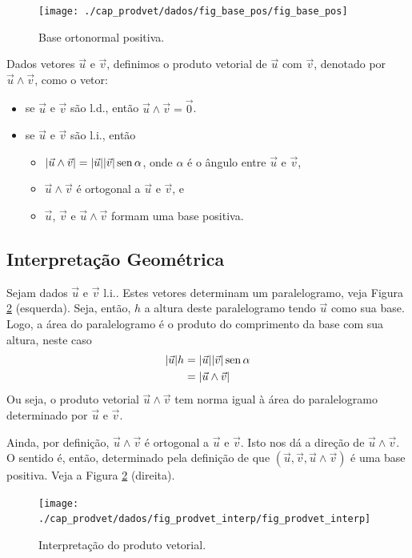 \begin{figure}[H]
  \centering
  \texttt{[image: ./cap\_prodvet/dados/fig\_base\_pos/fig\_base\_pos]}
  \caption{Base ortonormal positiva.}
  \label{fig:base_pos}
\end{figure}

Dados vetores $\vec{u}$ e $\vec{v}$, definimos o produto vetorial de $\vec{u}$ com $\vec{v}$, denotado por $\vec{u}\land\vec{v}$, como o vetor:
\begin{itemize}
\item se $\vec{u}$ e $\vec{v}$ são l.d., então $\vec{u}\land\vec{v} = \vec{0}$.
\item se $\vec{u}$ e $\vec{v}$ são l.i., então
  \begin{itemize}
  \item $|\vec{u}\land\vec{v}| = |\vec{u}||\vec{v}|\operatorname{sen}\alpha$, onde $\alpha$ é o ângulo entre $\vec{u}$ e $\vec{v}$,
  \item $\vec{u}\land\vec{v}$ é ortogonal a $\vec{u}$ e $\vec{v}$, e
  \item $\vec{u}$, $\vec{v}$ e $\vec{u}\land\vec{v}$ formam uma base positiva.
  \end{itemize}
\end{itemize}

\subsection{Interpretação Geométrica}

Sejam dados $\vec{u}$ e $\vec{v}$ l.i.. Estes vetores determinam um paralelogramo, veja Figura \ref{fig:prodvet_interp} (esquerda). Seja, então, $h$ a altura deste paralelogramo tendo $\vec{u}$ como sua base. Logo, a área do paralelogramo é o produto do comprimento da base com sua altura, neste caso
\begin{align}
  |\vec{u}|h &= |\vec{u}||\vec{v}|\operatorname{sen}\alpha\\
             &= |\vec{u}\land\vec{v}|
\end{align}
Ou seja, o produto vetorial $\vec{u}\land\vec{v}$ tem norma igual à área do paralelogramo determinado por $\vec{u}$ e $\vec{v}$.

Ainda, por definição, $\vec{u}\land\vec{v}$ é ortogonal a $\vec{u}$ e $\vec{v}$. Isto nos dá a direção de $\vec{u}\land\vec{v}$. O sentido é, então, determinado pela definição de que $(\vec{u},\vec{v},\vec{u}\land\vec{v})$ é uma base positiva. Veja a Figura \ref{fig:prodvet_interp} (direita).

\begin{figure}[H]
  \centering
  \texttt{[image: ./cap\_prodvet/dados/fig\_prodvet\_interp/fig\_prodvet\_interp]}
  \caption{Interpretação do produto vetorial.}
  \label{fig:prodvet_interp}
\end{figure}

